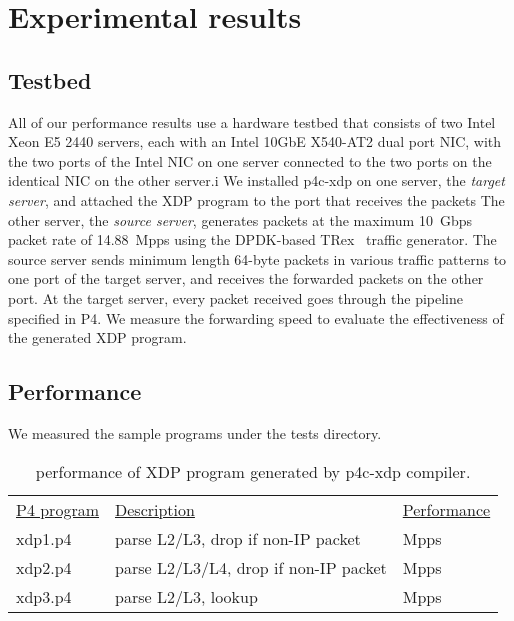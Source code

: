 \section{Experimental results}\label{sec:results}

\subsection{Testbed}
All of our performance results use a hardware testbed that consists of
two Intel Xeon E5 2440 servers, each with an Intel 10GbE X540-AT2 dual
port NIC, with the two ports of the Intel NIC on one server connected
to the two ports on the identical NIC on the other server.i
We installed p4c-xdp on one server, the {\em target server}, and
attached the XDP program to the port that receives the packets
The other server, the {\em source server}, generates packets
at the maximum 10~Gbps packet rate of 14.88~Mpps using the DPDK-based
TRex~\cite{trex} traffic generator.  The source server sends minimum
length 64-byte packets in various traffic patterns to one port of the
target server, and receives the forwarded packets on the other port.
At the target server, every packet received goes through the
pipeline specified in P4.
We measure the forwarding speed to evaluate the effectiveness of the
generated XDP program.

\subsection{Performance}
We measured the sample programs under the tests directory.

\begin{table}
\centering
\small
\begin{tabular}{lll}
  \underline{P4 program} & \underline{Description} & \underline{Performance} \\
  xdp1.p4 & parse L2/L3, drop if non-IP packet &  Mpps \\
  xdp2.p4 & parse L2/L3/L4, drop if non-IP packet &  Mpps \\
  xdp3.p4 & parse L2/L3, lookup &  Mpps \\
\end{tabular}
\caption{\footnotesize performance of XDP program generated by
  p4c-xdp compiler.}
\label{table:treebuild}
\end{table}
